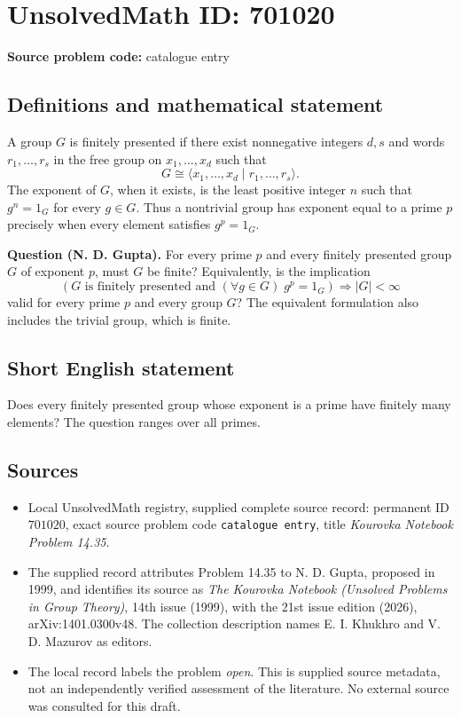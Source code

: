 \documentclass[11pt]{article}
\begin{document}
\section*{UnsolvedMath ID: 701020}
\textbf{Source problem code:} catalogue entry
\subsection{Definitions and mathematical statement}
A group \(G\) is finitely presented if there exist nonnegative integers \(d,s\) and words \(r_1,\ldots,r_s\) in the free group on \(x_1,\ldots,x_d\) such that
\[
G\cong\langle x_1,\ldots,x_d\mid r_1,\ldots,r_s\rangle.
\]
The exponent of \(G\), when it exists, is the least positive integer \(n\) such that \(g^n=1_G\) for every \(g\in G\). Thus a nontrivial group has exponent equal to a prime \(p\) precisely when every element satisfies \(g^p=1_G\).

\textbf{Question (N. D. Gupta).} For every prime \(p\) and every finitely presented group \(G\) of exponent \(p\), must \(G\) be finite? Equivalently, is the implication
\[
\left(G\text{ is finitely presented and }(\forall g\in G)\;g^p=1_G\right)
\Longrightarrow |G|<\infty
\]
valid for every prime \(p\) and every group \(G\)? The equivalent formulation also includes the trivial group, which is finite.
\subsection{Short English statement}
Does every finitely presented group whose exponent is a prime have finitely many elements? The question ranges over all primes.
\subsection{Sources}
\begin{itemize}
\item Local UnsolvedMath registry, supplied complete source record: permanent ID \(701020\), exact source problem code \texttt{catalogue entry}, title \emph{Kourovka Notebook Problem 14.35}.
\item The supplied record attributes Problem 14.35 to N. D. Gupta, proposed in 1999, and identifies its source as \emph{The Kourovka Notebook (Unsolved Problems in Group Theory)}, 14th issue (1999), with the 21st issue edition (2026), arXiv:1401.0300v48. The collection description names E. I. Khukhro and V. D. Mazurov as editors.
\item The local record labels the problem \emph{open}. This is supplied source metadata, not an independently verified assessment of the literature. No external source was consulted for this draft.
\end{itemize}
\end{document}
